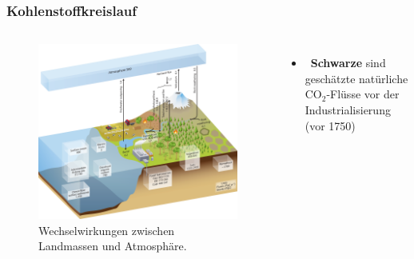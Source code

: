\begin{frame}
	\frametitle{Kohlenstoffkreislauf}
	\begin{columns}
		\begin{figure}
			\centering
			\includegraphics[width=0.9\linewidth]{bilder/kohlenstoff/cycle_arrows-land-and-atmosphere.png}
			\caption{Wechselwirkungen zwischen Landmassen und Atmosphäre.}
		\end{figure}
		\begin{itemize}
			\item [] \textbf{Schwarze \rightarrow} sind geschätzte natürliche CO$_2$-Flüsse vor der Industrialisierung (vor 1750)
		\end{itemize}
	\end{columns}
\end{frame}


